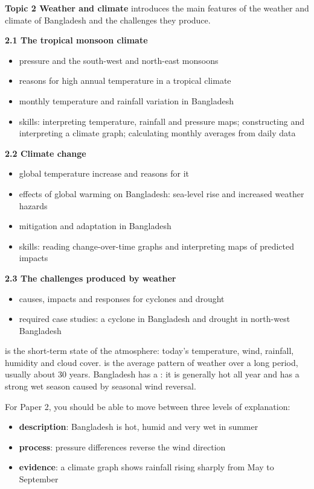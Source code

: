 \documentclass[11pt,a4paper]{article}
\begin{document}
\begin{syllabusbox}
\textbf{Topic 2 Weather and climate} introduces the main features of the weather and climate of Bangladesh and the challenges they produce.

\textbf{2.1 The tropical monsoon climate}
\begin{itemize}
  \item pressure and the south-west and north-east monsoons
  \item reasons for high annual temperature in a tropical climate
  \item monthly temperature and rainfall variation in Bangladesh
  \item skills: interpreting temperature, rainfall and pressure maps; constructing and interpreting a climate graph; calculating monthly averages from daily data
\end{itemize}

\textbf{2.2 Climate change}
\begin{itemize}
  \item global temperature increase and reasons for it
  \item effects of global warming on Bangladesh: sea-level rise and increased weather hazards
  \item mitigation and adaptation in Bangladesh
  \item skills: reading change-over-time graphs and interpreting maps of predicted impacts
\end{itemize}

\textbf{2.3 The challenges produced by weather}
\begin{itemize}
  \item causes, impacts and responses for cyclones and drought
  \item required case studies: a cyclone in Bangladesh and drought in north-west Bangladesh
\end{itemize}
\end{syllabusbox}


 is the short-term state of the atmosphere: today's temperature, wind, rainfall, humidity and cloud cover.  is the average pattern of weather over a long period, usually about 30 years. Bangladesh has a : it is generally hot all year and has a strong wet season caused by seasonal wind reversal.

For Paper 2, you should be able to move between three levels of explanation:
\begin{itemize}
  \item \textbf{description}: Bangladesh is hot, humid and very wet in summer
  \item \textbf{process}: pressure differences reverse the wind direction
  \item \textbf{evidence}: a climate graph shows rainfall rising sharply from May to September
\end{itemize}
\end{document}
